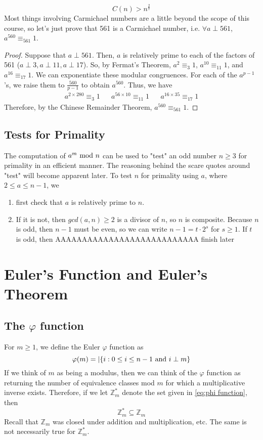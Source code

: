 \documentclass[10pt]{article}
\newcommand\ZZ{{\mathbb Z}}
\renewcommand\mod{{\textnormal{~mod~}}}
\theoremstyle{definition}
\begin{document}
\[ C(n) > n^{\frac{2}{7}}\]
Most things involving Carmichael numbers are a little beyond the scope of this course, so let's just prove that 561 is a Carmichael number, i.e. $\forall a\perp 561$, $a^{560}\equiv_{561} 1$. 
\begin{proof}
Suppose that $a\perp 561$.  Then, $a$ is relatively prime to each of the factors of 561 ($a\perp 3, a\perp 11, a\perp 17$).  So, by Fermat's Theorem, $a^2\equiv_{3} 1$, $a^{10}\equiv_11 1$, and $a^{16}\equiv_{17} 1$.  We can exponentiate these modular congruences.  For each of the $a^{p-1}$'s, we raise them to $\frac{560}{p-1}$ to obtain $a^{560}$.  Thus, we have 
\begin{align*}
a^{2\times 280} \equiv_3 1 && a^{56\times 10} \equiv_{11} 1 && a^{16\times 35} \equiv_{17} 1
\end{align*}
Therefore, by the Chinese Remainder Theorem, $a^{560} \equiv_{561} 1$.  
\end{proof}
\subsection{Tests for Primality}
The computation of $a^m \mod n$ can be used to "test" an odd number $n\geq 3$ for primality in an efficient manner.  The reasoning behind the scare quotes around "test" will become apparent later.  To test $n$ for primality using $a$, where $2\leq a \leq n-1$, we 
\begin{enumerate}
\item first check that $a$ is relatively prime to $n$.  
\item If it is not, then $gcd(a,n) \geq 2$ is a divisor of $n$, so $n$ is composite.  Because $n$ is odd, then $n-1$ must be even, so we can write $n-1 = t\cdot 2^s$ for $s\geq 1$.  If $t$ is odd, then AAAAAAAAAAAAAAAAAAAAAAAAAAA finish later
\end{enumerate}
\section{Euler's Function and Euler's Theorem}
\subsection{The $\varphi$ function}
For $m\geq 1$, we define the Euler $\varphi$ function as 
\begin{equation}
\varphi (m) = |\{ i:0\leq i\leq n-1 \textnormal{~and~} i\perp m \} \label{eq:phi function}
\end{equation}
If we think of $m$ as being a modulus, then we can think of the $\varphi$ function as returning the number of equivalence classes mod $m$ for which a multiplicative inverse exists.  Therefore, if we let $\ZZ_m^*$ denote the set given in \ref{eq:phi function}, then 
\[\ZZ_m^* \subseteq \ZZ_m \]
Recall that $\ZZ_m$ was closed under addition and multiplication, etc.  The same is not necessarily true for $\ZZ_m^*$.  
\end{document}
